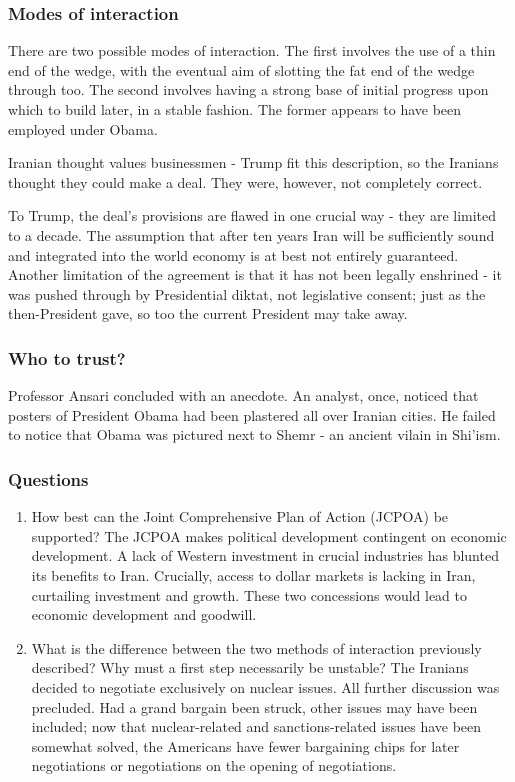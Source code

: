 \documentclass[11pt,a4paper]{report}
\begin{document}
\begin{multicols}{2}
\subsubsection{Modes of interaction}\label{modes-of-interaction}

There are two possible modes of interaction. The first involves the use
of a thin end of the wedge, with the eventual aim of slotting the fat
end of the wedge through too. The second involves having a strong base
of initial progress upon which to build later, in a stable fashion. The
former appears to have been employed under Obama.

Iranian thought values businessmen - Trump fit this description, so the
Iranians thought they could make a deal. They were, however, not
completely correct.

To Trump, the deal's provisions are flawed in one crucial way - they are
limited to a decade. The assumption that after ten years Iran will be
sufficiently sound and integrated into the world economy is at best not
entirely guaranteed. Another limitation of the agreement is that it has
not been legally enshrined - it was pushed through by Presidential
diktat, not legislative consent; just as the then-President gave, so too
the current President may take away.

\subsubsection{Who to trust?}\label{who-to-trust}

Professor Ansari concluded with an anecdote. An analyst, once, noticed
that posters of President Obama had been plastered all over Iranian
cities. He failed to notice that Obama was pictured next to Shemr - an
ancient vilain in Shi'ism.

\subsubsection{Questions}\label{questions}

\begin{enumerate}
	\def\labelenumi{\arabic{enumi}.}
	\item
	How best can the Joint Comprehensive Plan of Action (JCPOA) be
	supported? The JCPOA makes political development contingent on
	economic development. A lack of Western investment in crucial
	industries has blunted its benefits to Iran. Crucially, access to
	dollar markets is lacking in Iran, curtailing investment and growth.
	These two concessions would lead to economic development and goodwill.
	\item
	What is the difference between the two methods of interaction
	previously described? Why must a first step necessarily be unstable?
	The Iranians decided to negotiate exclusively on nuclear issues. All
	further discussion was precluded. Had a grand bargain been struck,
	other issues may have been included; now that nuclear-related and
	sanctions-related issues have been somewhat solved, the Americans have
	fewer bargaining chips for later negotiations or negotiations on the
	opening of negotiations.
\end{enumerate}


\end{multicols}
\end{document}
